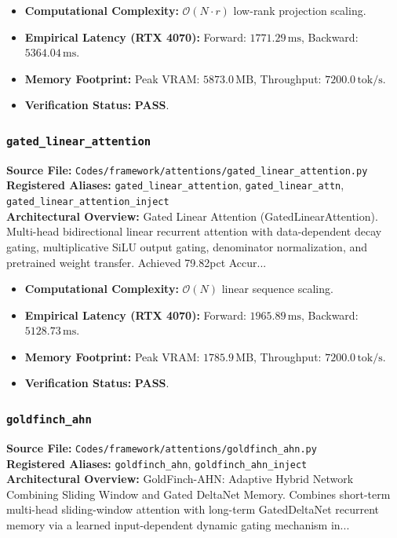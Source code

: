 \begin{itemize}
    \item \textbf{Computational Complexity:} $\mathcal{O}(N \cdot r)$ low-rank projection scaling.
    \item \textbf{Empirical Latency (RTX 4070):} Forward: $1771.29\,\text{ms}$, Backward: $5364.04\,\text{ms}$.
    \item \textbf{Memory Footprint:} Peak VRAM: $5873.0\,\text{MB}$, Throughput: $7200.0\,\text{tok/s}$.
    \item \textbf{Verification Status:} \textbf{PASS}.
\end{itemize}

\subsubsection{\texttt{gated\_linear\_attention}}
\textbf{Source File:} \texttt{Codes/framework/attentions/gated\_linear\_attention.py} \\
\textbf{Registered Aliases:} \texttt{gated\_linear\_attention}, \texttt{gated\_linear\_attn}, \texttt{gated\_linear\_attention\_inject} \\
\textbf{Architectural Overview:} Gated Linear Attention (GatedLinearAttention). Multi-head bidirectional linear recurrent attention with data-dependent decay gating, multiplicative SiLU output gating, denominator normalization, and pretrained weight transfer. Achieved 79.82pct Accur...

\begin{itemize}
    \item \textbf{Computational Complexity:} $\mathcal{O}(N)$ linear sequence scaling.
    \item \textbf{Empirical Latency (RTX 4070):} Forward: $1965.89\,\text{ms}$, Backward: $5128.73\,\text{ms}$.
    \item \textbf{Memory Footprint:} Peak VRAM: $1785.9\,\text{MB}$, Throughput: $7200.0\,\text{tok/s}$.
    \item \textbf{Verification Status:} \textbf{PASS}.
\end{itemize}

\subsubsection{\texttt{goldfinch\_ahn}}
\textbf{Source File:} \texttt{Codes/framework/attentions/goldfinch\_ahn.py} \\
\textbf{Registered Aliases:} \texttt{goldfinch\_ahn}, \texttt{goldfinch\_ahn\_inject} \\
\textbf{Architectural Overview:} GoldFinch-AHN: Adaptive Hybrid Network Combining Sliding Window and Gated DeltaNet Memory. Combines short-term multi-head sliding-window attention with long-term GatedDeltaNet recurrent memory via a learned input-dependent dynamic gating mechanism in...

